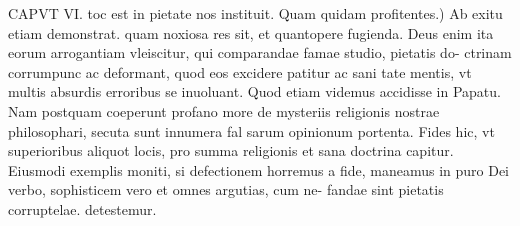 \documentclass{article}
\begin{document}
\begin{pages}
\marginpar{[ p.87 ]}CAPVT VI. \pstart toc est in pietate nos instituit.  \pend\pstart Quam quidam profitentes.) Ab exitu etiam demonstrat. quam noxiosa res sit, et quantopere fugienda. Deus enim ita eorum arrogantiam vleiscitur, qui comparandae famae studio, pietatis do- ctrinam corrumpunc ac deformant, quod eos excidere patitur ac sani tate mentis, vt multis absurdis erroribus se inuoluant. Quod etiam videmus accidisse in Papatu. Nam postquam coeperunt profano more de mysteriis religionis nostrae philosophari, secuta sunt innumera fal sarum opinionum portenta. Fides hic, vt superioribus aliquot locis, pro summa religionis et sana doctrina capitur. Eiusmodi exemplis moniti, si defectionem horremus a fide, maneamus in puro Dei verbo, sophisticem vero et omnes argutias, cum ne- fandae sint pietatis corruptelae. detestemur.  \pend
\endnumbering
\end{pages}
\end{document}

